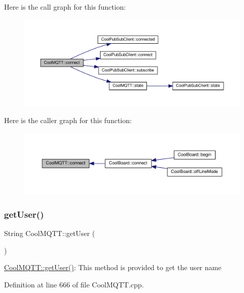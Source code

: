 Here is the call graph for this function\+:\nopagebreak
\begin{figure}[H]
\begin{center}
\leavevmode
\includegraphics[width=350pt]{d0/dd0/class_cool_m_q_t_t_a50075d0ab23a327ab897fd6adad20eda_cgraph}
\end{center}
\end{figure}
Here is the caller graph for this function\+:\nopagebreak
\begin{figure}[H]
\begin{center}
\leavevmode
\includegraphics[width=350pt]{d0/dd0/class_cool_m_q_t_t_a50075d0ab23a327ab897fd6adad20eda_icgraph}
\end{center}
\end{figure}
\mbox{\label{class_cool_m_q_t_t_a373cc92fca7760d886f02d8a6e5b3f63}} 
\subsubsection{\texorpdfstring{get\+User()}{getUser()}}
{\footnotesize\ttfamily String Cool\+M\+Q\+T\+T\+::get\+User (\begin{DoxyParamCaption}{ }\end{DoxyParamCaption})}

\hyperlink{class_cool_m_q_t_t_a373cc92fca7760d886f02d8a6e5b3f63}{Cool\+M\+Q\+T\+T\+::get\+User()}\+: This method is provided to get the user name 

Definition at line 666 of file Cool\+M\+Q\+T\+T.\+cpp.


